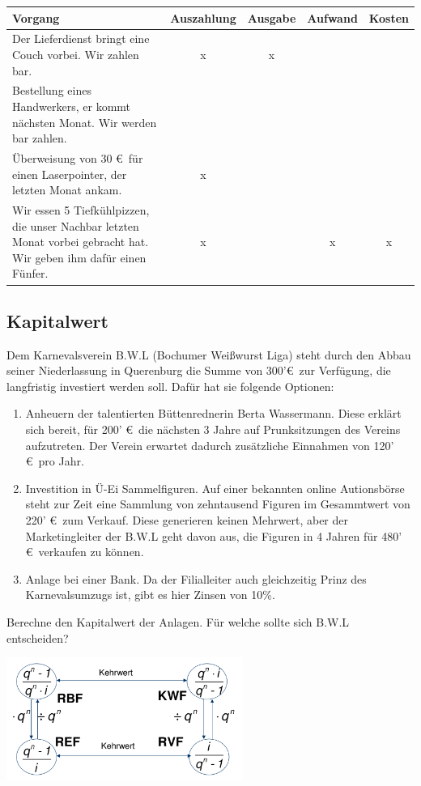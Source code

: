 \documentclass[11pt, a4paper]{article}
\begin{document}
\begin{tabularx}{\columnwidth}{X|c|c|c|c}
	Vorgang & Auszahlung & Ausgabe & Aufwand & Kosten \\ \hline
	Der Lieferdienst bringt eine Couch vorbei. Wir zahlen bar. & x & x &  &  \\ \hline
	Bestellung eines Handwerkers, er kommt nächsten Monat. Wir werden bar zahlen. &  &  &  &  \\ \hline
	Überweisung von 30 \euro \ für einen Laserpointer, der letzten Monat ankam. & x &  &  & \\ \hline
	Wir essen 5 Tiefkühlpizzen, die unser Nachbar letzten Monat vorbei gebracht hat. Wir geben ihm dafür einen Fünfer. & x &  & x & x
\end{tabularx}

\subsection{Kapitalwert}
Dem Karnevalsverein B.W.L (Bochumer Weißwurst Liga) steht durch den Abbau seiner Niederlassung in Querenburg die Summe von 300'\euro \ zur Verfügung, die langfristig investiert werden soll. Dafür hat sie folgende Optionen:
\begin{enumerate}
	\item Anheuern der talentierten Büttenrednerin Berta Wassermann. Diese erklärt sich bereit, für 200' \euro \ die nächsten 3 Jahre auf Prunksitzungen des Vereins aufzutreten. Der Verein erwartet dadurch zusätzliche Einnahmen von 120' \euro \ pro Jahr.
	\item Investition in Ü-Ei Sammelfiguren. Auf einer bekannten online Autionsbörse steht zur Zeit eine Sammlung von zehntausend Figuren im Gesammtwert von 220' \euro \ zum Verkauf. Diese generieren keinen Mehrwert, aber der Marketingleiter der B.W.L geht davon aus, die Figuren in 4 Jahren für 480' \euro \ verkaufen zu können.
	\item Anlage bei einer Bank. Da der Filialleiter auch gleichzeitig Prinz des Karnevalsumzugs ist, gibt es hier Zinsen von 10\%.
\end{enumerate}
Berechne den Kapitalwert der Anlagen. Für welche sollte sich B.W.L entscheiden?

\includegraphics[height=4cm]{RentenUndKapitalfaktoren.png}
\end{document}
